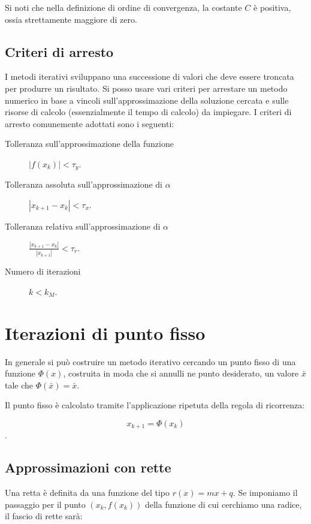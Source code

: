 \documentclass[12pt]{article}
\theoremstyle{plain}%
\theoremstyle{definition}
\theoremstyle{remark}
\begin{document}
Si noti che nella definizione di ordine di convergenza, la costante $C$
è positiva, ossia strettamente maggiore di zero.

\subsection{Criteri di arresto}

I metodi iterativi sviluppano una successione di valori che deve essere troncata
per produrre un risultato.
Si posso usare vari criteri per arrestare un metodo numerico in base a vincoli
sull'approssimazione della soluzione cercata e sulle risorse di calcolo
(essenzialmente il tempo di calcolo) da impiegare.
I criteri di arresto comunemente adottati sono i seguenti:

\begin{description}
\item[Tolleranza sull'approssimazione della funzione]$|f(x_k)| < \tau_y$.
\item[Tolleranza assoluta sull'approssimazione di $\alpha$] $|x_{k + 1} - x_{k}| < \tau_x$.
\item[Tolleranza relativa sull'approssimazione di $\alpha$] $\frac{|x_{k + 1} - x_{k}|}{|x_{k+1}|} < \tau_r$.
\item[Numero di iterazioni] $k < k_M$. 
\end{description}




\section{Iterazioni di punto fisso}

In generale si può costruire un metodo iterativo cercando un punto fisso di una funzione $\Phi(x)$,
costruita in moda che si annulli ne punto desiderato, un valore $\bar{x}$ tale che $\Phi(\bar{x}) = \bar{x}$.

Il punto fisso è calcolato tramite l'applicazione ripetuta della regola di ricorrenza:

$$x_{k+1} = \Phi(x_k)$$.

\subsection{Approssimazioni con rette}

Una retta è definita da una funzione del tipo $r(x) = m x + q$.
Se imponiamo il passaggio per il punto $(x_k, f(x_k))$ della funzione di cui cerchiamo una radice, il fascio di rette sarà:
\end{document}
